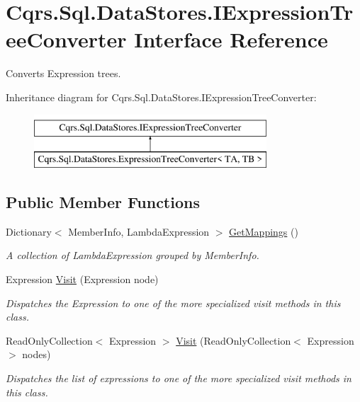 \hypertarget{interfaceCqrs_1_1Sql_1_1DataStores_1_1IExpressionTreeConverter}{}\section{Cqrs.\+Sql.\+Data\+Stores.\+I\+Expression\+Tree\+Converter Interface Reference}
\label{interfaceCqrs_1_1Sql_1_1DataStores_1_1IExpressionTreeConverter}


Converts Expression trees.  


Inheritance diagram for Cqrs.\+Sql.\+Data\+Stores.\+I\+Expression\+Tree\+Converter\+:\begin{figure}[H]
\begin{center}
\leavevmode
\includegraphics[height=2.000000cm]{interfaceCqrs_1_1Sql_1_1DataStores_1_1IExpressionTreeConverter}
\end{center}
\end{figure}
\subsection*{Public Member Functions}
\begin{DoxyCompactItemize}
\item 
Dictionary$<$ Member\+Info, Lambda\+Expression $>$ \hyperlink{interfaceCqrs_1_1Sql_1_1DataStores_1_1IExpressionTreeConverter_ad48480ecf7056a2b2cc079006cc2a589_ad48480ecf7056a2b2cc079006cc2a589}{Get\+Mappings} ()
\begin{DoxyCompactList}\small\item\em A collection of Lambda\+Expression grouped by Member\+Info. \end{DoxyCompactList}\item 
Expression \hyperlink{interfaceCqrs_1_1Sql_1_1DataStores_1_1IExpressionTreeConverter_ae5904ce74f9184703c51b58840770172_ae5904ce74f9184703c51b58840770172}{Visit} (Expression node)
\begin{DoxyCompactList}\small\item\em Dispatches the Expression to one of the more specialized visit methods in this class. \end{DoxyCompactList}\item 
Read\+Only\+Collection$<$ Expression $>$ \hyperlink{interfaceCqrs_1_1Sql_1_1DataStores_1_1IExpressionTreeConverter_a24431bb6665d6d9b617f244049190655_a24431bb6665d6d9b617f244049190655}{Visit} (Read\+Only\+Collection$<$ Expression $>$ nodes)
\begin{DoxyCompactList}\small\item\em Dispatches the list of expressions to one of the more specialized visit methods in this class. \end{DoxyCompactList}\end{DoxyCompactItemize}


